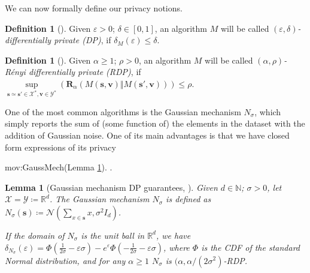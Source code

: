 \documentclass{article}
\newcommand{\Arxiv}[1]{}
\newcommand{\Arxiv}[1]{#1}
\theoremstyle{plain}
\newtheorem{lemma}[theorem]{Lemma}
\theoremstyle{definition}
\newtheorem{definition}[theorem]{Definition}
\newcommand{\eps}{\varepsilon}
\newcommand{\reals}{\mathbb{R}}
\newcommand{\naturals}{\mathbb{N}}
\newcommand{\outDom}{\mathcal{Y}}
\newcommand{\alg}{M}
\newcommand{\domain}{\mathcal{X}}
\newcommand{\dataset}{\boldsymbol{s}}
\newcommand{\view}{\boldsymbol{v}}
\newcommand{\Renyi}[1]{\boldsymbol{R}_{#1}}
\newcommand{\RenyiDiv}[3]{\Renyi{#1}\left(#2 \Vert #3 \right)}
\newcommand{\privProf}[1]{\delta_{#1}}
\begin{document}
We can now formally define our privacy notions.

\begin{definition}[\Arxiv{Differential privacy }\citep{DKMMN06}]
    Given $\eps > 0$; $\delta \in [0, 1 ]$, an algorithm $\alg$ will be called \emph{$(\eps, \delta)$-differentially private (DP)}, if $\privProf{\alg}(\eps) \le \delta$.
\end{definition}

\begin{definition}[\Arxiv{R\'{e}nyi differential privacy }\citep{Mironov17}]
    Given $\alpha \ge 1$; $\rho > 0$, an algorithm $\alg$ will be called \emph{$(\alpha, \rho)$-R\'{e}nyi differentially private (RDP)}, if $\underset{\dataset \simeq \dataset' \in \domain^{*}, \view \in \outDom^{*}}{\sup} \left( \RenyiDiv{\alpha}{\alg(\dataset, \view)}{\alg(\dataset', \view)} \right) \le \rho$.
\end{definition}

One of the most common algorithms is the Gaussian mechanism $N_{\sigma}$, which simply reports the sum of (some function of) the elements in the dataset with the addition of Gaussian noise.
One of its main advantages  is that we have closed form expressions of its privacy
\begin{movable}{mov:GaussMech}{(Lemma \ref{lem:gaussPriv}).}
.

\begin{lemma}[Gaussian mechanism DP guarantees, \citep{BW18,Mironov17}] \label{lem:gaussPriv}
     Given $d \in \naturals$; $\sigma > 0$, let $\domain = \outDom \coloneqq \reals^{d}$. The \emph{Gaussian mechanism} $N_{\sigma}$ is defined as $N_{\sigma}(\dataset) \coloneqq \mathcal{N}(\sum_{x \in \dataset} x, \sigma^{2} I_{d})$.

    If the domain of $N_{\sigma}$ is the unit ball in $\reals^{d}$, we have $\privProf{N_{\sigma}}(\eps) = \Phi \left(\frac{1}{2 \sigma} - \eps \sigma \right) - e^{\eps} \Phi \left(-\frac{1}{2 \sigma} - \eps \sigma \right)$, where $\Phi$ is the CDF of the standard Normal distribution, and for any $\alpha \ge 1$ $N_{\sigma}$ is $(\alpha, \alpha / (2 \sigma^{2})$-RDP.
\end{lemma}
\end{movable}
\end{document}
